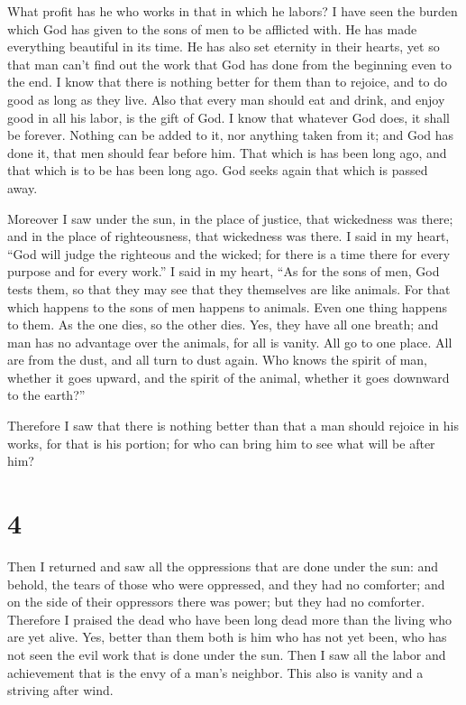  What profit has he who works in that in which he labors?
 I have seen the burden which God has given to the sons
of men to be afflicted with.  He has made everything
beautiful in its time. He has also set eternity in their hearts, yet so
that man can't find out the work that God has done from the beginning
even to the end.  I know that there is nothing better for
them than to rejoice, and to do good as long as they live.
 Also that every man should eat and drink, and enjoy good
in all his labor, is the gift of God.  I know that
whatever God does, it shall be forever. Nothing can be added to it, nor
anything taken from it; and God has done it, that men should fear before
him.  That which is has been long ago, and that which is
to be has been long ago. God seeks again that which is passed away.

 Moreover I saw under the sun, in the place of justice,
that wickedness was there; and in the place of righteousness, that
wickedness was there.  I said in my heart, ``God will
judge the righteous and the wicked; for there is a time there for every
purpose and for every work.''  I said in my heart, ``As
for the sons of men, God tests them, so that they may see that they
themselves are like animals.  For that which happens to
the sons of men happens to animals. Even one thing happens to them. As
the one dies, so the other dies. Yes, they have all one breath; and man
has no advantage over the animals, for all is vanity. 
All go to one place. All are from the dust, and all turn to dust again.
 Who knows the spirit of man, whether it goes upward, and
the spirit of the animal, whether it goes downward to the earth?''

 Therefore I saw that there is nothing better than that a
man should rejoice in his works, for that is his portion; for who can
bring him to see what will be after him?

\hypertarget{section-3}{%
\section{4}\label{section-3}}

 Then I returned and saw all the oppressions that are done
under the sun: and behold, the tears of those who were oppressed, and
they had no comforter; and on the side of their oppressors there was
power; but they had no comforter.  Therefore I praised the
dead who have been long dead more than the living who are yet alive.
 Yes, better than them both is him who has not yet been,
who has not seen the evil work that is done under the sun.
 Then I saw all the labor and achievement that is the envy
of a man's neighbor. This also is vanity and a striving after wind.

